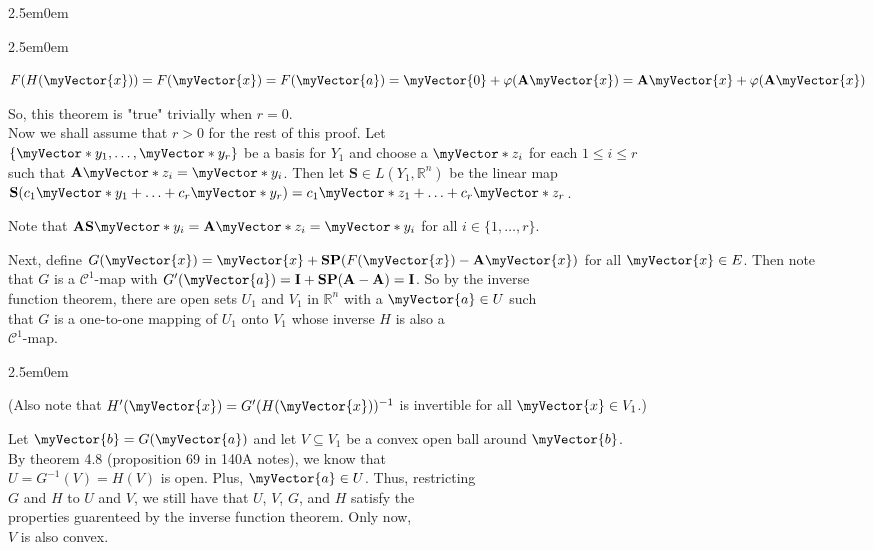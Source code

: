 \documentclass{book}
\newenvironment{myIndent}{%
   \begin{adjustwidth}{2.5em}{0em}%
}{%
   \end{adjustwidth}%
}
\newcommand{\retTwo}{\hfill\bigbreak}
\newcommand{\mVec}[1]{\myVector{#1}}
\newcommand{\mVecAst}[1]{\myVector*{#1}}
\newcommand{\mMat}[1]{\mathbf{#1}}
\begin{document}
{\begin{myIndent}
{\begin{myIndent}
      {\centering $F(H(\mVec{x})) = F(\mVec{x}) = F(\mVec{a}) = \mVec{0} + \varphi(\mMat{A}\mVec{x}) = \mMat{A}\mVec{x} + \varphi(\mMat{A}\mVec{x})$ \retTwo\par}
      
      So, this theorem is "true" trivially when $r = 0$.\\ [8pt]

      Now we shall assume that $r > 0$ for the rest of this proof. Let\\ $\{\mVecAst{y}_1, \ldots, \mVecAst{y}_r\}$ be a basis for $Y_1$ and choose a $\mVecAst{z}_i$ for each $1 \leq i \leq r$\\ such that $\mMat{A}\mVecAst{z}_i = \mVecAst{y}_i$. Then let $\mMat{S} \in L(Y_1, \mathbb{R}^n)$ be the linear map\\ $\mMat{S}(c_1\mVecAst{y}_1 + \ldots + c_r\mVecAst{y}_r) = c_1\mVecAst{z}_1 + \ldots + c_r\mVecAst{z}_r$.

      \newpage

      Note that $\mMat{AS}\mVecAst{y}_i = \mMat{A}\mVecAst{z}_i = \mVecAst{y}_i$ for all $i \in \{1, \ldots, r\}$.\retTwo

      Next, define $G(\mVec{x}) = \mVec{x} + \mMat{SP}(F(\mVec{x}) - \mMat{A}\mVec{x})$ for all $\mVec{x} \in E$. Then note\\ that $G$ is a $\mathscr{C}^1$-map with $G^\prime(\mVec{a}) = \mMat{I} + \mMat{SP}(\mMat{A} - \mMat{A}) = \mMat{I}$. So by the inverse\\ function theorem, there are open sets $U_1$ and $V_1$ in $\mathbb{R}^n$ with a $\mVec{a} \in U$ such\\ that $G$ is a one-to-one mapping of $U_1$ onto $V_1$ whose inverse $H$ is also a\\ $\mathscr{C}^1$-map.
      
      \begin{myIndent}
         (Also note that $H^\prime(\mVec{x}) = G^\prime(H(\mVec{x}))^{-1}$ is invertible for all $\mVec{x} \in V_1$.)\retTwo
      \end{myIndent}

      Let $\mVec{b} = G(\mVec{a})$ and let $V \subseteq V_1$ be a convex open ball around $\mVec{b}$.\\ By theorem 4.8 (proposition 69 in 140A notes), we know that\\ $U = G^{-1}(V) = H(V)$ is open. Plus, $\mVec{a} \in U$. Thus, restricting\\ $G$ and $H$ to $U$ and $V$, we still have that $U$, $V$, $G$, and $H$ satisfy the\\ properties guarenteed by the inverse function theorem. Only now,\\ $V$ is also convex.\retTwo


\end{myIndent}}
\end{myIndent}}
\end{document}

